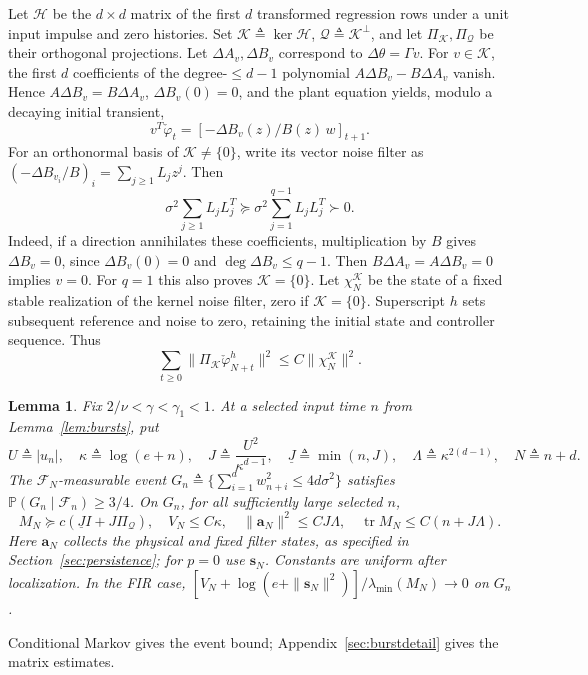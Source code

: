 \documentclass[11pt,reqno]{amsart}
\numberwithin{equation}{section}
\newtheorem{lemma}[theorem]{Lemma}
\theoremstyle{definition}
\theoremstyle{remark}
\newcommand{\Prob}{\mathbb P}
\newcommand{\F}{\mathcal F}
\newcommand{\phc}{\check{\varphi}}
\newcommand{\tr}{\operatorname{tr}}
\begin{document}
Let $\mathcal H$ be the $d\times d$ matrix of the first $d$ transformed regression rows under a unit input impulse and zero histories. Set $\mathcal K\triangleq\ker\mathcal H$, $\mathcal Q\triangleq\mathcal K^\perp$, and let $\Pi_{\mathcal K},\Pi_{\mathcal Q}$ be their orthogonal projections.
Let $\Delta A_v,\Delta B_v$ correspond to $\Delta\theta=\Gamma v$. For $v\in\mathcal K$, the first $d$ coefficients of the degree-$\le d-1$ polynomial $A\Delta B_v-B\Delta A_v$ vanish. Hence $A\Delta B_v=B\Delta A_v$, $\Delta B_v(0)=0$, and the plant equation yields, modulo a decaying initial transient,
\begin{equation}\label{eq:kernel}
 v^T\phc_t=[-\Delta B_v(z)/B(z)\,w]_{t+1}.
\end{equation}
For an orthonormal basis of $\mathcal K\ne\{0\}$, write its vector noise filter as
$(-\Delta B_{v_i}/B)_i=\sum_{j\ge1}L_jz^j$. Then
\begin{equation*}
 \sigma^2\sum_{j\ge1}L_jL_j^T\succeq\sigma^2\sum_{j=1}^{q-1}L_jL_j^T\succ0.
\end{equation*}
Indeed, if a direction annihilates these coefficients, multiplication by $B$ gives
$\Delta B_v=0$, since $\Delta B_v(0)=0$ and $\deg\Delta B_v\le q-1$.
Then $B\Delta A_v=A\Delta B_v=0$ implies $v=0$.
For $q=1$ this also proves $\mathcal K=\{0\}$.
Let $\chi_N^{\mathcal K}$ be the state of a fixed stable realization of the kernel noise filter, zero if $\mathcal K=\{0\}$. Superscript $h$ sets subsequent reference and noise to zero, retaining the initial state and controller sequence. Thus
\begin{equation}\label{eq:kernelhom}
 \sum_{t\ge0}\|\Pi_{\mathcal K}\phc_{N+t}^{h}\|^2
 \le C\|\chi_N^{\mathcal K}\|^2.
\end{equation}
\begin{lemma}\label{lem:burstinfo}
Fix $2/\nu<\gamma<\gamma_1<1$. At a selected input time $n$ from Lemma~\ref{lem:bursts}, put
\begin{equation}\label{eq:burstscale}
 U\triangleq|u_n|,\quad \kappa\triangleq\log(e+n),\quad
 J\triangleq\frac{U^2}{\kappa^{d-1}},\quad \underline J\triangleq\min(n,J),\quad
 \Lambda\triangleq\kappa^{2(d-1)},\quad N\triangleq n+d.
\end{equation}
The $\F_N$-measurable event
$G_n\triangleq\{\sum_{i=1}^{d}w_{n+i}^2\le4d\sigma^2\}$ satisfies
$\Prob(G_n\mid\F_n)\ge3/4$. On $G_n$, for all sufficiently large selected $n$,
\begin{equation}\label{eq:burstinfo}
 M_N\succeq c(\underline J I+J\Pi_{\mathcal Q}),\quad
 V_N\le C\kappa,\quad
 \|\mathbf a_N\|^2\le CJ\Lambda,\quad
 \tr M_N\le C(n+J\Lambda).
\end{equation}
Here $\mathbf a_N$ collects the physical and fixed filter states, as specified in Section~\ref{sec:persistence}; for $p=0$ use $\mathbf s_N$. Constants are uniform after localization. In the FIR case,
$[V_N+\log(e+\|\mathbf s_N\|^2)]/\lambda_{\min}(M_N)\to0$ on $G_n$.
\end{lemma}
Conditional Markov gives the event bound; Appendix~\ref{sec:burstdetail} gives the matrix estimates.
\end{document}
